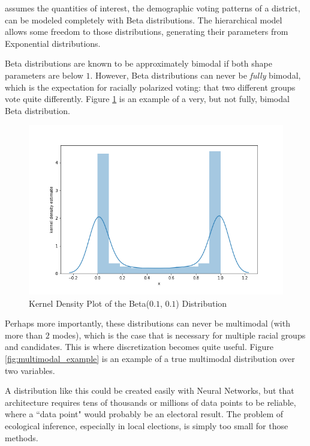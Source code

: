  assumes the quantities of interest, the demographic voting patterns of a district, can be modeled completely with Beta distributions. The hierarchical model allows some freedom to those distributions, generating their parameters from Exponential distributions.

Beta distributions are known to be approximately bimodal if both shape parameters are below $1$. However, Beta distributions can never be \textit{fully} bimodal, which is the expectation for racially polarized voting: that two different groups vote quite differently. Figure \ref{fig:beta_example} is an example of a very, but not fully, bimodal Beta distribution.

\begin{figure}[ht]\centering
 \includegraphics[width=\linewidth]{figures/beta_example.png}
 \caption{Kernel Density Plot of the Beta($0.1$, $0.1$) Distribution}
 \label{fig:beta_example}
\end{figure}

Perhaps more importantly, these distributions can never be multimodal (with more than $2$ modes), which is the case that is necessary for multiple racial groups and candidates. This is where discretization becomes quite useful. Figure \ref{fig:multimodal_example} is an example of a true multimodal distribution over two variables.

A distribution like this could be created easily with Neural Networks, but that architecture requires tens of thousands or millions of data points to be reliable, where a ``data point" would probably be an electoral result. The problem of ecological inference, especially in local elections, is simply too small for those methods.

